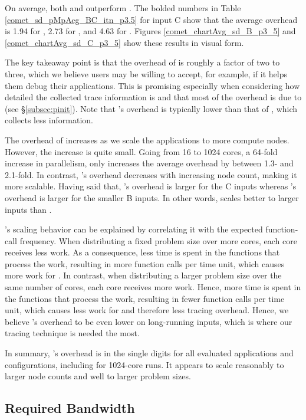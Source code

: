 On average, both \parlotm and \parlota outperform \callgrind. The bolded numbers in Table \ref{comet_sd_pMpAcg_BC_itn_p3.5} for input C show that the average overhead is 1.94 for \parlotm, 2.73 for \parlota, and 4.63 for \callgrind. Figures \ref{comet_chartAvg_sd_B_p3_5} and \ref{comet_chartAvg_sd_C_p3_5} show these results in visual form.


The key takeaway point is that the overhead of \parlot is roughly a factor of two to three, which we believe users may be willing to accept, for example, if it helps them debug their applications. This is promising especially when considering how detailed the collected trace information is and that most of the overhead is due to \pin (see \S\ref{subsec:pinit}). Note that \parlot 's overhead is typically lower than that of \callgrind, which collects less information.

The overhead of \parlot increases as we scale the applications to more compute nodes. However, the increase is quite small. Going from 16 to 1024 cores, a 64-fold increase in parallelism, only increases the average overhead by between 1.3- and 2.1-fold. In contrast, \callgrind 's overhead decreases with increasing node count, making it more scalable. Having said that, \callgrind 's overhead is larger for the C inputs whereas \parlot 's overhead is larger for the smaller B inputs. In other words, \parlot scales better to larger inputs than \callgrind.

\parlot 's scaling behavior can be explained by correlating it with the expected function-call frequency. When distributing a fixed problem size over more cores, each core receives less work. As a consequence, less time is spent in the functions that process the work, resulting in more function calls per time unit, which causes more work for \parlot. In contrast, when distributing a larger problem size over the same number of cores, each core receives more work. Hence, more time is spent in the functions that process the work, resulting in fewer function calls per time unit, which causes less work for \parlot and therefore less tracing overhead. Hence, we believe \parlot 's overhead to be even lower on long-running inputs, which is where our tracing technique is needed the most.


In summary, \parlot 's overhead is in the single digits for all evaluated applications and configurations, including for 1024-core runs. It appears to scale reasonably to larger node counts and well to larger problem sizes.

\subsection{Required Bandwidth}
\label{subsec:lowbw}

